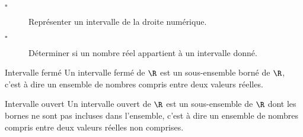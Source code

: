 \begin{titre}

\end{titre}


\begin{CpsCol}
\begin{description}
\item[$\square$] Représenter un intervalle de la droite numérique. 
\item[$\square$]  Déterminer si un nombre réel appartient à un intervalle donné.
\end{description}
\end{CpsCol}



\begin{DefT}{Intervalle fermé}
Un intervalle fermé de $\R$ est un sous-ensemble borné de $\R$, c'est à dire un ensemble de nombres compris entre deux valeurs réelles.
\end{DefT}

\begin{DefT}{Intervalle ouvert}
Un intervalle ouvert de $\R$ est un sous-ensemble de $\R$ dont les bornes ne sont pas incluses dans l'ensemble, c'est à dire un ensemble de nombres compris entre deux valeurs réelles non comprises.
\end{DefT}

